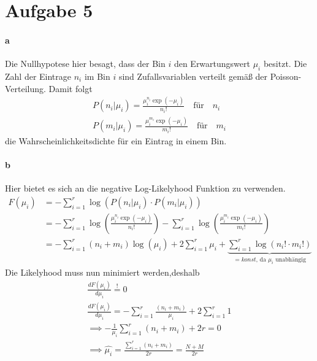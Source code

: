 \section{Aufgabe 5}
\label{sec:Aufgabe5}
%
\paragraph{a} Die Nullhypotese hier besagt, dass der Bin $i$ den Erwartungswert $\mu_i$ besitzt. Die 
Zahl der Eintrage $n_i$ im Bin $i$ sind Zufallsvariablen verteilt gemäß der Poisson-Verteilung. 
Damit folgt
\begin{gather}
P(n_i \vert \mu_i) = \frac{\mu_{i}^{ n_i} \exp(-\mu_i)}{n_i !} 	
\quad \text{für} \quad n_i \\
P(m_i \vert \mu_i) = \frac{\mu_{i}^{ m_i} \exp(-\mu_i)}{m_i !} 	
\quad \text{für} \quad m_i 
\end{gather}
die Wahrscheinlichkeitsdichte für ein Eintrag in einem Bin. 

\paragraph{b}
Hier bietet es sich an die negative Log-Likelyhood Funktion zu verwenden. 
\begin{equation}
\begin{split}
F(\mu_i) &= - \sum_{i=1}^r \log(P(n_i \vert \mu_i)\cdot P(m_i \vert \mu_i))\\
&= - \sum_{i=1}^r \log \left(\frac{\mu_{i}^{ n_i} \exp(-\mu_i)}{n_i !} \right)
-\sum_{i=1}^r \log \left(\frac{\mu_{i}^{ m_i} \exp(-\mu_i)}{m_i !} \right)\\
&= - \sum_{i=1}^r (n_i+m_i)\log(\mu_{i})  +2\sum_{i=1}^r\mu_i + 
\underbrace{\sum_{i=1}^r \log(n_i !\cdot m_i!)}_{ =konst  \text{, da $\mu_i$ unabhängig}}
\end{split}
\end{equation}
Die Likelyhood muss nun minimiert werden,deshalb
\begin{gather}
\frac{d F(\mu_i)}{d\mu_i} \stackrel{!}{=} 0 \\
\frac{d F(\mu_i)}{d\mu_i} =  - \sum_{i=1}^r \frac{(n_i + m_i)}{\mu_{i}}  +2\sum_{i=1}^r 1  \\
\implies - \frac{1}{\mu_{i}}\sum_{i=1}^r (n_i + m_i) + 2r = 0 \\
\implies \hat{\mu_i} = \frac{\sum_{i=1}^r  (n_i + m_i)}{2r} = \frac{N + M}{2r}
\end{gather}

